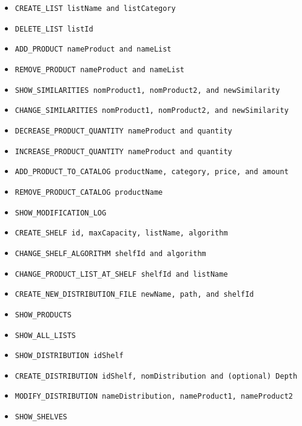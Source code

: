 \documentclass[a4paper, t]{article}
\begin{document}
\begin{itemize}
    \item \texttt{CREATE\_LIST listName and listCategory}
    \item \texttt{DELETE\_LIST listId}
    \item \texttt{ADD\_PRODUCT nameProduct and nameList}
    \item \texttt{REMOVE\_PRODUCT nameProduct and nameList}
    \item \texttt{SHOW\_SIMILARITIES nomProduct1, nomProduct2, and newSimilarity}
    \item \texttt{CHANGE\_SIMILARITIES nomProduct1, nomProduct2, and newSimilarity}
    \item \texttt{DECREASE\_PRODUCT\_QUANTITY nameProduct and quantity}
    \item \texttt{INCREASE\_PRODUCT\_QUANTITY nameProduct and quantity}
    \item \texttt{ADD\_PRODUCT\_TO\_CATALOG productName, category, price, and amount}
    \item \texttt{REMOVE\_PRODUCT\_CATALOG productName}
    \item \texttt{SHOW\_MODIFICATION\_LOG}
    \item \texttt{CREATE\_SHELF id, maxCapacity, listName, algorithm}
    \item \texttt{CHANGE\_SHELF\_ALGORITHM shelfId and algorithm}
    \item \texttt{CHANGE\_PRODUCT\_LIST\_AT\_SHELF shelfId and listName}
    \item \texttt{CREATE\_NEW\_DISTRIBUTION\_FILE newName, path, and shelfId}
    \item \texttt{SHOW\_PRODUCTS}
    \item \texttt{SHOW\_ALL\_LISTS}
    \item \texttt{SHOW\_DISTRIBUTION idShelf}
    \item \texttt{CREATE\_DISTRIBUTION idShelf, nomDistribution and (optional) Depth}
    \item \texttt{MODIFY\_DISTRIBUTION nameDistribution, nameProduct1, nameProduct2}
    \item \texttt{SHOW\_SHELVES}
\end{itemize}

\newpage
\end{document}
